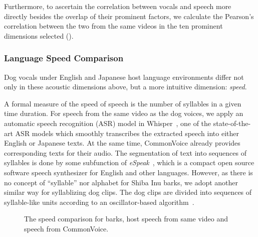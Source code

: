 Furthermore, to ascertain the correlation between vocals and speech more 
directly besides the overlap of their prominent factors, we calculate the 
Pearson's correlation between the two from the same videos 
in the ten prominent dimensions selected (). 

\subsubsection{Language Speed Comparison}
\label{sec:prominentfactor1}
Dog vocals under English and Japanese host language environments differ not only in these 
acoustic dimensions above, but a more intuitive dimension: \textit{speed}.

A formal measure of the speed of speech is the number of syllables in 
a given time duration. For speech from the same video as the dog voices, 
we apply an automatic speech 
recognition (ASR) model in Whisper~\cite{radford2022robust}, one of the state-of-the-art ASR models 
which smoothly transcribes the extracted speech into either English or Japanese texts. 
At the same time, CommonVoice already provides corresponding texts for their audio.
The segmentation of text into sequences of syllables is done by some subfunction of 
\textit{eSpeak}~\cite{duddington2012espeak}, which is a compact open source software speech synthesizer for 
English and other languages.
However, as there is no concept of ``syllable'' nor alphabet for Shiba 
Inu barks, 
we adopt another similar way for syllablizing dog clips. The dog clips are 
divided into sequences of syllable-like units according to an oscillator-based 
algorithm~\cite{rasanen2018pre}.
\begin{figure}[th]
	\centering
	\caption{The speed comparison for barks, host speech from same video and speech from CommonVoice.}
	\label{fig:speedcomparison}
\end{figure}

